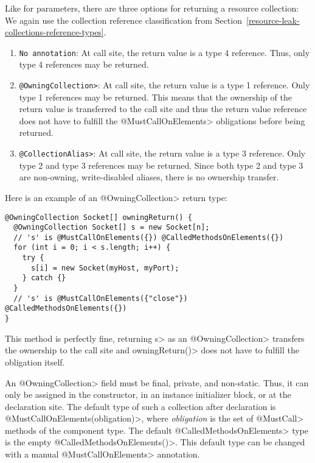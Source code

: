 Like for parameters, there are three options for returning a resource collection:
We again use the collection reference classification from Section~\ref{resource-leak-collections-reference-types}.
\begin{enumerate}
  \item \texttt{No annotation}: At call site, the return value is a type 4 reference. Thus, only type 4 references may be returned.
  \item \texttt{\<@OwningCollection>}: At call site, the return value is a type 1 reference. Only type 1 references may be returned. This means that the ownership of the return value is transferred to the call site and thus the return value reference does not have to fulfill the \<@MustCallOnElements> obligations before being returned.
  \item \texttt{\<@CollectionAlias>}: At call site, the return value is a type 3 reference. Only type 2 and type 3 references may be returned. Since both type 2 and type 3 are non-owning, write-disabled aliases, there is no ownership transfer.
\end{enumerate}

Here is an example of an \<@OwningCollection> return type:
\begin{verbatim}
@OwningCollection Socket[] owningReturn() {
  @OwningCollection Socket[] s = new Socket[n];
  // 's' is @MustCallOnElements({}) @CalledMethodsOnElements({})
  for (int i = 0; i < s.length; i++) {
    try {
      s[i] = new Socket(myHost, myPort);
    } catch {}
  }
  // 's' is @MustCallOnElements({"close"}) @CalledMethodsOnElements({})
}
\end{verbatim}

This method is perfectly fine, returning \<s> as an \<@OwningCollection> transfers the ownership to the call site and \<owningReturn()> does not have to fulfill the obligation itself.


An \<@OwningCollection> field must be final, private, and non-static. Thus, it
can only be assigned in the constructor, in an instance initializer block, or at the declaration site.
The default type of such a collection after declaration is \<@MustCallOnElements(obligation)>, where \textit{obligation} is the set of \<@MustCall> methods of the component type. The default \<@CalledMethodsOnElements> type is the empty \<@CalledMethodsOnElements({})>. This default type can be changed with a manual \<@MustCallOnElements> annotation.

